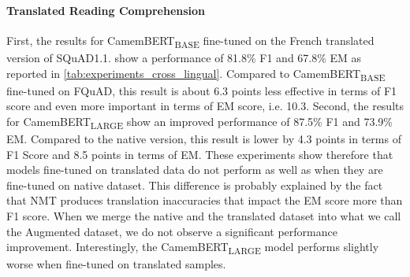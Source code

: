 \documentclass{article}
\begin{document}
\paragraph{Translated Reading Comprehension}
First, the results for CamemBERT\textsubscript{BASE} fine-tuned on the French translated version of SQuAD1.1. show a performance of 81.8\% F1 and 67.8\% EM as reported in \ref{tab:experiments_cross_lingual}.
Compared to CamemBERT\textsubscript{BASE} fine-tuned on FQuAD, this result is about 6.3 points less effective in terms of F1 score and even more important in terms of EM score, i.e. 10.3.
Second, the results for CamemBERT\textsubscript{LARGE} show an improved performance of 87.5\% F1 and 73.9\% EM.
Compared to the native version, this result is lower by 4.3 points in terms of F1 Score and 8.5 points in terms of EM. 
These experiments show therefore that models fine-tuned on translated data do not perform as well as when they are fine-tuned on native dataset.
This difference is probably explained by the fact that NMT produces translation inaccuracies that impact the EM score more than F1 score.
When we merge the native and the translated dataset into what we call the Augmented dataset, we do not observe a significant performance improvement. 
Interestingly, the CamemBERT\textsubscript{LARGE} model performs slightly worse when fine-tuned on translated samples.
\end{document}
